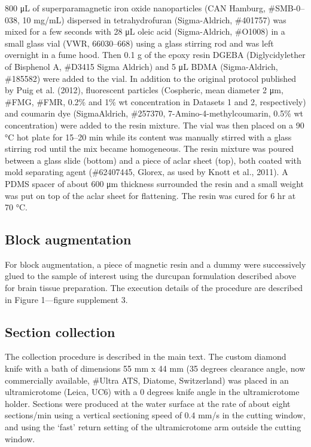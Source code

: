 \documentclass{article}
\begin{document}
800 μL of superparamagnetic iron oxide nanoparticles (CAN Hamburg, \#SMB-0–038, 10 mg/mL) dispersed in tetrahydrofuran (Sigma-Aldrich, \#401757) was mixed for a few seconds with 28 μL oleic acid (Sigma-Aldrich, \#O1008) in a small glass vial (VWR, 66030–668) using a glass stirring rod and was left overnight in a fume hood. Then 0.1 g of the epoxy resin DGEBA (Diglycidylether of Bisphenol A, \#D3415 Sigma Aldrich) and 5 μL BDMA (Sigma-Aldrich, \#185582) were added to the vial. In addition to the original protocol published by Puig et al. (2012), fluorescent particles (Cospheric, mean diameter 2 μm, \#FMG, \#FMR, 0.2\% and 1\% wt concentration in Datasets 1 and 2, respectively) and coumarin dye (SigmaAldrich, \#257370, 7-Amino-4-methylcoumarin, 0.5\% wt concentration) were added to the resin mixture. The vial was then placed on a 90 °C hot plate for 15–20 min while its content was manually stirred with a glass stirring rod until the mix became homogeneous. The resin mixture was poured between a glass slide (bottom) and a piece of aclar sheet (top), both coated with mold separating agent (\#62407445, Glorex, as used by Knott et al., 2011). A PDMS spacer of about 600 μm thickness surrounded the resin and a small weight was put on top of the aclar sheet for flattening. The resin was cured for 6 hr at 70 °C.

\subsection*{Block augmentation}

For block augmentation, a piece of magnetic resin and a dummy were successively glued to the sample of interest using the durcupan formulation described above for brain tissue preparation. The execution details of the procedure are described in Figure 1---figure supplement 3.

\subsection*{Section collection}

The collection procedure is described in the main text. The custom diamond knife with a bath of dimensions 55 mm x 44 mm (35 degrees clearance angle, now commercially available, \#Ultra ATS, Diatome, Switzerland) was placed in an ultramicrotome (Leica, UC6) with a 0 degrees knife angle in the ultramicrotome holder. Sections were produced at the water surface at the rate of about eight sections/min using a vertical sectioning speed of 0.4 mm/s in the cutting window, and using the ‘fast’ return setting of the ultramicrotome arm outside the cutting window.
\end{document}
